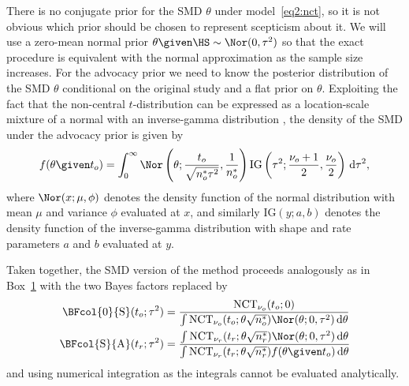 There is no conjugate prior for the SMD $\theta$ under model~\eqref{eq2:nct}, so
it is not obvious which prior should be chosen to represent scepticism about it.
We will use a zero-mean normal prior $\theta \given \HS \sim \Nor(0, \tau^{2})$
so that the exact procedure is equivalent with the normal approximation as the
sample size increases. For the advocacy prior we need to know the posterior
distribution of the SMD $\theta$ conditional on the original study and a flat
prior on $\theta$. Exploiting the fact that the non-central $t$-distribution can
be expressed as a location-scale mixture of a normal with an inverse-gamma
distribution
\citep[Chapter 31]{Johnson1995}, the density of the SMD under the advocacy prior
is given by
\begin{align*}
  f(\theta \given t_o)
  = \int_0^\infty \Nor\left(\theta; \frac{t_o}{\sqrt{n_o^* \tau^2}},
  \frac{1}{n_o^*}\right)  \text{IG}\left(\tau^2; \frac{\nu_o + 1}{2},
  \frac{\nu_o}{2}\right) \, \text{d}\tau^2,
\end{align*}
where $\Nor(x; \mu, \phi)$ denotes the density function of the normal
distribution with mean $\mu$ and variance $\phi$ evaluated at $x$, and similarly
$\text{IG}(y; a, b)$ denotes the density function of the inverse-gamma
distribution with shape and rate parameters $a$ and $b$ evaluated at $y$.

Taken together, the SMD version of the method proceeds analogously as in
Box~\hyperref[box:nutshell]{1} with the two Bayes factors replaced by
\begin{align*}
  \BFcol{0}{\mathrm{S}}(t_{o};\tau^{2})
  &= \frac{\text{NCT}_{\nu_{o}}(t_{o}; 0)}{\int
  \text{NCT}_{\nu_{o}}(t_{o}; \theta \sqrt{n_{o}^{*}})
  \Nor(\theta; 0, \tau^{2}) \, \text{d}\theta} \\
  \BFcol{\text{S}}{\text{A}}(t_{r};\tau^{2})
  &= \frac{\int\text{NCT}_{\nu_{r}}(t_{r};\theta
  \sqrt{n_{r}^{*}})\Nor(\theta; 0, \tau^{2}) \, \text{d}\theta}{
  \int\text{NCT}_{\nu_{r}}(t_{r};\theta
  \sqrt{n_{r}^{*}}) f(\theta \given t_{o}) \, \text{d} \theta}
\end{align*}
and using numerical integration as the integrals cannot be evaluated
analytically.



